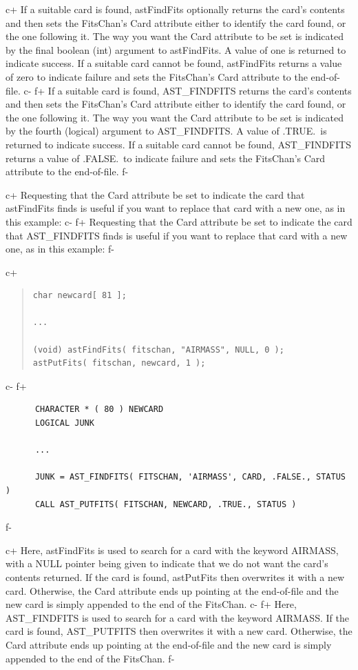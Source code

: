 \documentclass[twoside,11pt]{article}
\begin{document}
c+
If a suitable card is found, astFindFits optionally returns the card's
contents and then sets the FitsChan's Card attribute either to
identify the card found, or the one following it. The way you want the
Card attribute to be set is indicated by the final boolean (int)
argument to astFindFits. A value of one is returned to indicate
success.  If a suitable card cannot be found, astFindFits returns a
value of zero to indicate failure and sets the FitsChan's Card
attribute to the end-of-file.
c-
f+
If a suitable card is found, AST\_FINDFITS returns the card's contents
and then sets the FitsChan's Card attribute either to identify the
card found, or the one following it. The way you want the Card
attribute to be set is indicated by the fourth (logical) argument to
AST\_FINDFITS. A value of .TRUE.\ is returned to indicate success.  If
a suitable card cannot be found, AST\_FINDFITS returns a value of
.FALSE.\ to indicate failure and sets the FitsChan's Card attribute to
the end-of-file.
f-

c+
Requesting that the Card attribute be set to indicate the card that
astFindFits finds is useful if you want to replace that card with a
new one, as in this example:
c-
f+
Requesting that the Card attribute be set to indicate the card that
AST\_FINDFITS finds is useful if you want to replace that card with a
new one, as in this example:
f-

c+
\begin{quote}
\small
\begin{verbatim}
char newcard[ 81 ];

...

(void) astFindFits( fitschan, "AIRMASS", NULL, 0 );
astPutFits( fitschan, newcard, 1 );
\end{verbatim}
\normalsize
\end{quote}
c-
f+
\small
\begin{verbatim}
      CHARACTER * ( 80 ) NEWCARD
      LOGICAL JUNK

      ...

      JUNK = AST_FINDFITS( FITSCHAN, 'AIRMASS', CARD, .FALSE., STATUS )
      CALL AST_PUTFITS( FITSCHAN, NEWCARD, .TRUE., STATUS )
\end{verbatim}
\normalsize
f-

c+
Here, astFindFits is used to search for a card with the keyword
AIRMASS, with a NULL pointer being given to indicate that we do not
want the card's contents returned. If the card is found, astPutFits
then overwrites it with a new card.  Otherwise, the Card attribute
ends up pointing at the end-of-file and the new card is simply
appended to the end of the FitsChan.
c-
f+
Here, AST\_FINDFITS is used to search for a card with the keyword
AIRMASS. If the card is found, AST\_PUTFITS then overwrites it with a
new card.  Otherwise, the Card attribute ends up pointing at the
end-of-file and the new card is simply appended to the end of the
FitsChan.
f-
\end{document}
